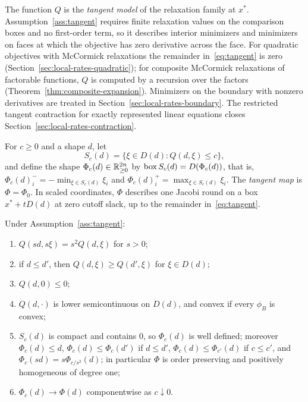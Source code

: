 The function $Q$ is the \emph{tangent model} of the relaxation family at
$x^*$. Assumption~\ref{ass:tangent} requires finite relaxation values on
the comparison boxes and no first-order term, so it describes interior
minimizers and minimizers on faces at which the objective has zero
derivative across the face. For quadratic objectives with McCormick
relaxations the remainder in~\eqref{eq:tangent} is zero
(Section~\ref{sec:local-rates-quadratic}); for composite McCormick
relaxations of factorable functions, $Q$ is computed by a recursion over
the factors (Theorem~\ref{thm:composite-expansion}). Minimizers on the
boundary with nonzero derivatives are treated in
Section~\ref{sec:local-rates-boundary}. The restricted tangent contraction for
exactly represented linear equations closes
Section~\ref{sec:local-rates-contraction}.

For $c\ge0$ and a shape $d$, let
\[
  S_c(d)=\{\xi\in D(d):Q(d,\xi)\le c\},
\]
and define the shape $\Phi_c(d)\in\mathbb{R}^{2n}_{\ge0}$ by
$\operatorname{box} S_c(d)=D(\Phi_c(d))$, that is, $\Phi_c(d)_i^-=-\min_{\xi\in S_c(d)}\xi_i$
and $\Phi_c(d)_i^+=\max_{\xi\in S_c(d)}\xi_i$. The \emph{tangent map} is
$\Phi=\Phi_0$. In scaled coordinates, $\Phi$ describes one Jacobi round on a
box $x^*+tD(d)$ at zero cutoff slack, up to the remainder
in~\eqref{eq:tangent}.

\begin{lemma}\label{lem:tangent-properties}
Under Assumption~\ref{ass:tangent}:
\begin{enumerate}[label=(\alph*)]
\item $Q(sd,s\xi)=s^2Q(d,\xi)$ for $s>0$;
\item if $d\le d'$, then $Q(d,\xi)\ge Q(d',\xi)$ for $\xi\in D(d)$;
\item $Q(d,0)\le0$;
\item $Q(d,\cdot)$ is lower semicontinuous on $D(d)$, and convex if every
  $\phi_B$ is convex;
\item $S_c(d)$ is compact and contains $0$, so $\Phi_c(d)$ is well defined;
  moreover $\Phi_c(d)\le d$, $\Phi_c(d)\le\Phi_c(d')$ if $d\le d'$,
  $\Phi_c(d)\le\Phi_{c'}(d)$ if $c\le c'$, and
  $\Phi_c(sd)=s\Phi_{c/s^2}(d)$; in particular $\Phi$ is order preserving
  and positively homogeneous of degree one;
\item $\Phi_c(d)\to\Phi(d)$ componentwise as $c\downarrow0$.
\end{enumerate}
\end{lemma}

